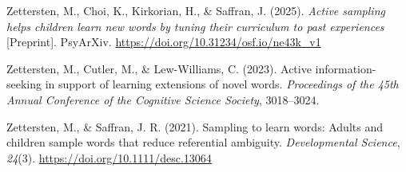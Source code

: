 \documentclass[10pt, letterpaper]{article}
\begin{document}
\begin{CSLReferences}{1}{0}
Zettersten, M., Choi, K., Kirkorian, H., \& Saffran, J. (2025).
\emph{Active sampling helps children learn new words by tuning their
curriculum to past experiences} {[}Preprint{]}. PsyArXiv.
\url{https://doi.org/10.31234/osf.io/ne43k_v1}

Zettersten, M., Cutler, M., \& Lew-Williams, C. (2023). Active
information-seeking in support of learning extensions of novel words.
\emph{Proceedings of the 45th {Annual} {Conference} of the {Cognitive}
{Science} {Society}}, 3018--3024.

Zettersten, M., \& Saffran, J. R. (2021). Sampling to learn words:
Adults and children sample words that reduce referential ambiguity.
\emph{Developmental Science}, \emph{24}(3).
\url{https://doi.org/10.1111/desc.13064}

\end{CSLReferences}


\end{document}
